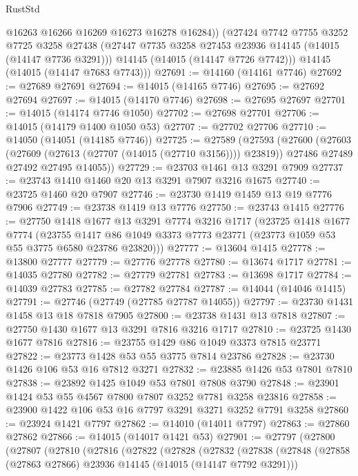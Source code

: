 \begin{lexlean}{RustStd}
\begin{coremodule}
          @16263
          @16266
          @16269
          @16273
          @16278
          @16284))
      (@27424
        @7742
        @7755
        @3252
        @7725
        @3258
        @27438
        (@27447 @7735 @3258 @27453 @23936 @14145 (@14015 (@14147 @7736 @3291)))
        @14145
        (@14015 (@14147 @7726 @7742)))
      @14145
      (@14015 (@14147 @7683 @7743)))
@27691 := @14160 (@14161 @7746)
@27692 := @27689 @27691
@27694 := @14015 (@14165 @7746)
@27695 := @27692 @27694
@27697 := @14015 (@14170 @7746)
@27698 := @27695 @27697
@27701 := @14015 (@14174 @7746 @1050)
@27702 := @27698 @27701
@27706 := @14015 (@14179 @1400 @1050 @53)
@27707 := @27702 @27706
@27710 := @14050 (@14051 (@14185 @7746))
@27725 := @27589
    (@27593
      (@27600
        (@27603 (@27609 (@27613 (@27707 (@14015 (@27710 @3156)))) @23819))
        @27486
        @27489
        @27492
        @27495
        @14055))
@27729 := @23703 @1461 @13 @3291 @7909
@27737 := @23743 @1410 @1460 @20 @13 @3291 @7907 @3216 @1675
@27740 := @23725 @1460 @20 @7907
@27746 := @23730 @1419 @1459 @13 @19 @7776 @7906
@27749 := @23738 @1419 @13 @7776
@27750 := @23743 @1415
@27776 := @27750
    @1418
    @1677
    @13
    @3291
    @7774
    @3216
    @1717
    (@23725
      @1418
      @1677
      @7774
      (@23755 @1417 @86 @1049 @3373 @7773 @23771 (@23773 @1059 @53 @55 @3775 @6580 @23786 @23820)))
@27777 := @13604 @1415
@27778 := @13800 @27777
@27779 := @27776 @27778
@27780 := @13674 @1717
@27781 := @14035 @27780
@27782 := @27779 @27781
@27783 := @13698 @1717
@27784 := @14039 @27783
@27785 := @27782 @27784
@27787 := @14044 (@14046 @1415)
@27791 := @27746 (@27749 (@27785 @27787 @14055))
@27797 := @23730 @1431 @1458 @13 @18 @7818 @7905
@27800 := @23738 @1431 @13 @7818
@27807 := @27750 @1430 @1677 @13 @3291 @7816 @3216 @1717
@27810 := @23725 @1430 @1677 @7816
@27816 := @23755 @1429 @86 @1049 @3373 @7815 @23771
@27822 := @23773 @1428 @53 @55 @3775 @7814 @23786
@27828 := @23730 @1426 @106 @53 @16 @7812 @3271
@27832 := @23885 @1426 @53 @7801 @7810
@27838 := @23892 @1425 @1049 @53 @7801 @7808 @3790
@27848 := @23901 @1424 @53 @55 @4567 @7800 @7807 @3252 @7781 @3258 @23816
@27858 := @23900 @1422 @106 @53 @16 @7797 @3291 @3271 @3252 @7791 @3258
@27860 := @23924 @1421 @7797
@27862 := @14010 (@14011 @7797)
@27863 := @27860 @27862
@27866 := @14015 (@14017 @1421 @53)
@27901 := @27797
    (@27800
      (@27807
        (@27810
          (@27816
            (@27822
              (@27828
                (@27832
                  (@27838
                    (@27848
                      (@27858 (@27863 @27866) @23936 @14145 (@14015 (@14147 @7792 @3291)))

\end{coremodule}
\end{lexlean}
